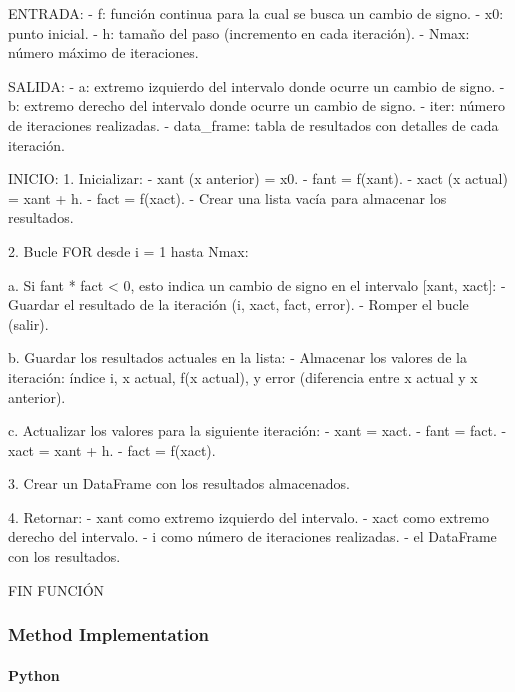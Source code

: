 \documentclass{article}
\begin{document}
    ENTRADA:
    - f: función continua para la cual se busca un cambio de signo.
    - x0: punto inicial.
    - h: tamaño del paso (incremento en cada iteración).
    - Nmax: número máximo de iteraciones.

    SALIDA:
    - a: extremo izquierdo del intervalo donde ocurre un cambio de signo.
    - b: extremo derecho del intervalo donde ocurre un cambio de signo.
    - iter: número de iteraciones realizadas.
    - data_frame: tabla de resultados con detalles de cada iteración.

    INICIO:
    1. Inicializar:
       - xant (x anterior) = x0.
       - fant = f(xant).
       - xact (x actual) = xant + h.
       - fact = f(xact).
       - Crear una lista vacía para almacenar los resultados.

    2. Bucle FOR desde i = 1 hasta Nmax:

       a. Si fant * fact < 0, esto indica un cambio de signo en el intervalo [xant, xact]:
          - Guardar el resultado de la iteración (i, xact, fact, error).
          - Romper el bucle (salir).

       b. Guardar los resultados actuales en la lista:
          - Almacenar los valores de la iteración: índice i, x actual, f(x actual), y error (diferencia entre x actual y x anterior).

       c. Actualizar los valores para la siguiente iteración:
          - xant = xact.
          - fant = fact.
          - xact = xant + h.
          - fact = f(xact).

    3. Crear un DataFrame con los resultados almacenados.

    4. Retornar:
       - xant como extremo izquierdo del intervalo.
       - xact como extremo derecho del intervalo.
       - i como número de iteraciones realizadas.
       - el DataFrame con los resultados.

FIN FUNCIÓN

        \subsubsection{Method Implementation}

            \paragraph{Python}
\end{document}
